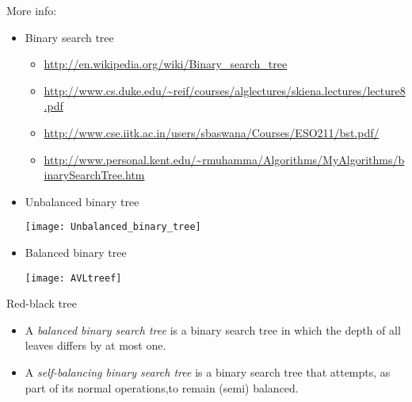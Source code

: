 More info:
\begin{itemize}
\item Binary search tree
  \begin{itemize}
  \item \url{http://en.wikipedia.org/wiki/Binary_search_tree}
  \item \url{http://www.cs.duke.edu/~reif/courses/alglectures/skiena.lectures/lecture8.pdf}
  \item \url{http://www.cse.iitk.ac.in/users/sbaswana/Courses/ESO211/bst.pdf/}
  \item \url{http://www.personal.kent.edu/~rmuhamma/Algorithms/MyAlgorithms/binarySearchTree.htm}
  \end{itemize}
\end{itemize}

\begin{frame}
  \begin{multicols}{2}
    \begin{itemize}
    \item[] Unbalanced binary tree
      \begin{center}
        \texttt{[image: Unbalanced\_binary\_tree]}
      \end{center}
    \item[] Balanced binary tree
      \begin{center}
        \texttt{[image: AVLtreef]}
      \end{center}
    \end{itemize}
  \end{multicols}
  \begin{center}
    Red-black tree
  \end{center}
  \begin{center}
     
  \end{center}
\end{frame}

\begin{itemize}
\item A \emph{balanced binary search tree} is a binary search tree in which the depth of
  all leaves differs by at most one.
\item A \emph{self-balancing binary search tree} is a binary search tree that attempts, as
  part of its normal operations,to remain (semi) balanced.
\end{itemize}

